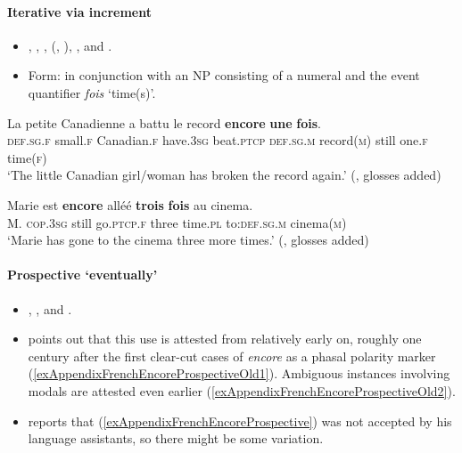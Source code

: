\paragraph{Iterative via increment}
\label{appendixFrenchIterativeIncrement}
\begin{itemize}
	\item \textcite[s.v. \textit{encore}]{Dicctionnaire}, \textcite{Borillo1984}, \textcite[535]{BatchelorChebliSaadi2011}, \citeauthor{Koenig1977} (\citeyear{Koenig1977}, \citeyear[145]{Koenig1991}), \textcite{Muller1991}, \textcite{Nef1981} and \textcite[487–488]{Price2013}.
	\item Form: in conjunction with an NP consisting of a numeral and the event quantifier \textit{fois} \lq time(s)'.
\end{itemize}
\begin{exe}
	\ex \gll La petite Canadienne a battu le record \textbf{encore} \textbf{une} \textbf{fois}.\\
	\textsc{def}.\textsc{sg}.\textsc{f} small.\textsc{f} Canadian.\textsc{f} have.3\textsc{sg} beat.\textsc{ptcp} \textsc{def}.\textsc{sg}.\textsc{m} record(\textsc{m}) still one.\textsc{f} time(\textsc{f})\\
	\glt \lq The little Canadian girl/woman has broken the record again.' (\cite[535]{BatchelorChebliSaadi2011}, glosses added)

	\ex \gll Marie est \textbf{encore} alléé \textbf{trois} \textbf{fois} au cinema.\\
	M. \textsc{cop}.3\textsc{sg} still go.\textsc{ptcp}.\textsc{f} three time.\textsc{pl} to:\textsc{def}.\textsc{sg}.\textsc{m} cinema(\textsc{m})\\
	\glt \lq Marie has gone to the cinema three more times.\rq{ }(\cite[43]{Donazzan2008}, glosses added)
\end{exe}

\paragraph{Prospective \lq eventually\rq{}}
\label{appendixFrenchEncoreProspective}
	\begin{itemize}
	\item \textcite[146–147]{MosegaardHansen2008}, \textcite{HoepelmanRohrer1980}, \textcite[142]{Koenig1991} and \textcite{Vaelikangas1982}.
	\item \textcite[146–147]{MosegaardHansen2008} points out that this use is attested from relatively early on, roughly one century after the first clear-cut cases of \textit{encore} as a phasal polarity marker (\ref{exAppendixFrenchEncoreProspectiveOld1}).
Ambiguous instances involving modals are attested even earlier (\ref{exAppendixFrenchEncoreProspectiveOld2}).
	\item \textcite{Vaelikangas1982} reports that (\ref{exAppendixFrenchEncoreProspective}) was not accepted by his language assistants, so there might be some variation.
	\end{itemize}
	
